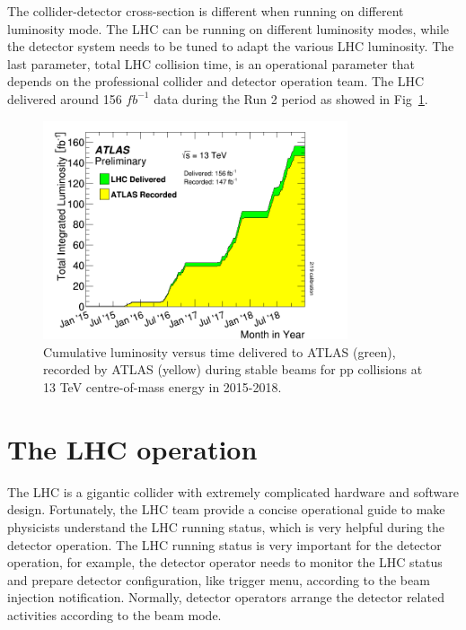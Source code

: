 \par The collider-detector cross-section is different when running on different luminosity mode. The LHC can be running on different luminosity modes, while the detector system needs to be tuned to adapt the various LHC luminosity. The last parameter, total LHC collision time, is an operational parameter that depends on the professional collider and detector operation team. The LHC delivered around 156 $fb^{-1}$ data during the Run 2 period as showed in Fig~\ref{fig:lumi0}.
\begin{figure}[htbp]
 \begin{center}
  \includegraphics[width=0.8\textwidth]{chapters/c4/figures/intlumivstimeRun2}
 \end{center}
    \caption{Cumulative luminosity versus time delivered to ATLAS (green), recorded by ATLAS (yellow) during stable beams for pp collisions at 13 TeV centre-of-mass energy in 2015-2018.} 
 \label{fig:lumi0}
\end{figure}

\section{The LHC operation}
\label{sec:lhcs1}
\par The LHC is a gigantic collider with extremely complicated hardware and software design. Fortunately, the LHC team provide a concise operational guide to make physicists understand the LHC running status, which is very helpful during the detector operation. The LHC running status is very important for the detector operation, for example, the detector operator needs to monitor the LHC status and prepare detector configuration, like trigger menu, according to the beam injection notification. Normally, detector operators arrange the detector related activities according to the beam mode.

